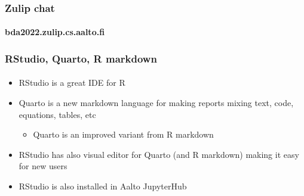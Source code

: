 \documentclass[english]{beamer}
\begin{document}
\begin{frame}

  \frametitle{Zulip chat}  %
  \framesubtitle{bda2022.zulip.cs.aalto.fi}
  
\end{frame}

\begin{frame}

  \frametitle{RStudio, Quarto, R markdown}  %
  \framesubtitle{}

  \begin{itemize}
  \item RStudio is a great IDE for R
  \item Quarto is a new markdown language for making reports mixing
    text, code, equations, tables, etc
    \begin{itemize}
    \item Quarto is an improved variant from R markdown
    \end{itemize}
  \item RStudio has also visual editor for Quarto (and R markdown)
    making it easy for new users
  \item RStudio is also installed in Aalto JupyterHub
  \end{itemize}
  
\end{frame}  
\end{document}
